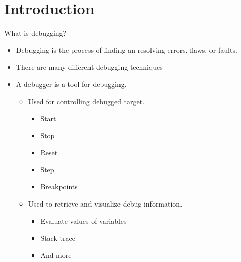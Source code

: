 \section{Introduction}

\begin{frame}{What is debugging?}
	\begin{itemize}
		\item Debugging is the process of finding an resolving errors, flaws, or faults.
		\item There are many different debugging techniques
		\item A debugger is a tool for debugging.
			\begin{itemize}
				\item Used for controlling debugged target.
			    \begin{itemize}
            \item Start
            \item Stop
            \item Reset
            \item Step
            \item Breakpoints
          \end{itemize}
				\item Used to retrieve and visualize debug information.
			    \begin{itemize}
            \item Evaluate values of variables
            \item Stack trace
            \item And more
          \end{itemize}
      \end{itemize}
	\end{itemize}
\end{frame}



